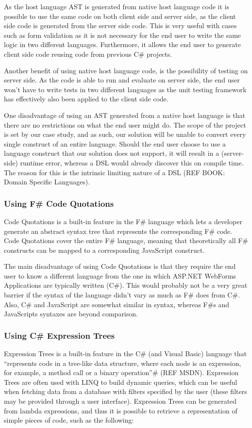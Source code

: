 		As the host language AST is generated from native host language code it is possible to use the same code on both client side and server side, as the client side code is generated from the server side code. This is very useful with cases such as form validation as it is not necessary for the end user to write the same logic in two different languages. Furthermore, it allows the end user to generate client side code reusing code from previous C\# projects.

		Another benefit of using native host language code, is the possibility of testing on server side. As the code is able to run and evaluate on server side, the end user won’t have to write tests in two different languages as the unit testing framework has effectively also been applied to the client side code.

		One disadvantage of using an AST generated from a native host language is that there are no restrictions on what the end user might do. The scope of the project is set by our case study, and as such, our solution will be unable to convert every single construct of an entire language. Should the end user choose to use a language construct that our solution does not support, it will result in a (server-side) runtime error, whereas a DSL would already discover this on compile time. The reason for this is the intrinsic limiting nature of a DSL (REF BOOK: Domain Specific Languages).

		\subsubsection{Using F\# Code Quotations}
			Code Quotations is a built-in feature in the F\# language which lets a developer generate an abstract syntax tree that represents the corresponding F\# code. Code Quotations cover the entire F\# language, meaning that theoretically all F\# constructs can be mapped to a corresponding JavaScript construct.

			The main disadvantage of using Code Quotations is that they require the end user to know a different language from the one in which ASP.NET WebForms Applications are typically written (C\#). This would probably not be a very great barrier if the syntax of the language didn’t vary as much as F\# does from C\#. Also, C\# and JavaScript are somewhat similar in syntax, whereas F\#s and JavaScripts syntaxes are beyond comparison.

		\subsubsection{Using C\# Expression Trees}
			Expression Trees is a built-in feature in the C\# (and Visual Basic) language that “represents code in a tree-like data structure, where each node is an expression, for example, a method call or a binary operation”\# (REF MSDN). Expression Trees are often used with LINQ to build dynamic queries, which can be useful when fetching data from a database with filters specified by the user (these filters may be provided through a user interface).
			Expression Trees can be generated from lambda expressions, and thus it is possible to retrieve a representation of simple pieces of code, such as the following:

